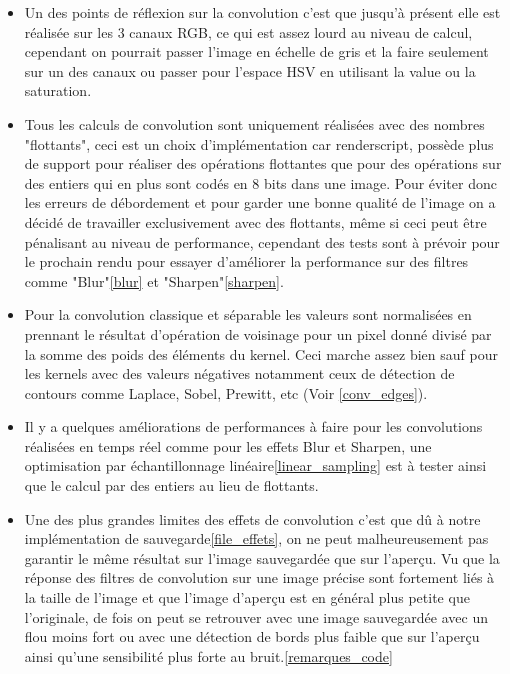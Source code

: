         
        \begin{itemize}
            \item {Un des points de réflexion sur la convolution c'est que jusqu'à présent elle est réalisée sur les 3 canaux RGB, ce qui est assez lourd au niveau de calcul,
            cependant on pourrait passer l'image en échelle de gris et la faire seulement sur un des canaux ou passer pour l'espace HSV en utilisant la value ou la saturation.}
            \item {Tous les calculs de convolution sont uniquement réalisées avec des nombres "flottants", ceci est un choix d'implémentation car renderscript, possède plus de support
            pour réaliser des opérations flottantes que pour des opérations sur des entiers qui en plus sont codés en 8 bits dans une image. Pour éviter donc les erreurs de débordement et pour garder une bonne qualité de l'image
            on a décidé de travailler exclusivement avec des flottants, même si ceci peut être pénalisant au niveau de performance, cependant des tests sont à prévoir pour le prochain rendu pour essayer
            d'améliorer la performance sur des filtres comme "Blur"\ref{blur} et "Sharpen"\ref{sharpen}.}
            \item {Pour la convolution classique et séparable les valeurs sont normalisées en prennant le résultat d'opération de voisinage pour un pixel donné
            divisé par la somme des poids des éléments du kernel. Ceci marche assez bien sauf pour les kernels avec des valeurs négatives notamment ceux de détection de contours comme Laplace, Sobel, Prewitt, etc (Voir \ref{conv_edges}).
            }

            \item {Il y a quelques améliorations de performances à faire pour les convolutions réalisées en temps réel comme pour les effets Blur et Sharpen, une optimisation par échantillonnage linéaire\ref{linear_sampling}
            est à tester ainsi que le calcul par des entiers au lieu de flottants.}

            \item {Une des plus grandes limites des effets de convolution c'est que dû à notre implémentation de sauvegarde\ref{file_effets}, on ne peut malheureusement pas garantir le même résultat sur l'image sauvegardée que sur l'aperçu.
            Vu que la réponse des filtres de convolution sur une image précise sont fortement liés à la taille de l’image et que l'image d'aperçu est en général plus petite que l'originale, de fois on peut se retrouver avec une image sauvegardée avec un flou moins fort ou avec une détection de bords plus faible que sur l'aperçu
            ainsi qu'une sensibilité plus forte au bruit.\ref{remarques_code}}
        \end{itemize} 





        
